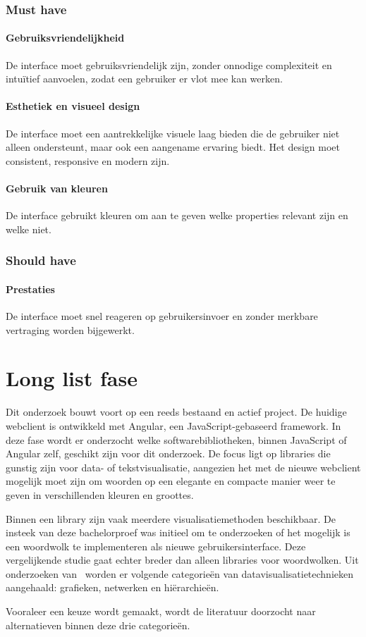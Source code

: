 \subsubsection{Must have}
\paragraph{Gebruiksvriendelijkheid}
De interface moet gebruiksvriendelijk zijn, zonder onnodige complexiteit en intuïtief aanvoelen, zodat een gebruiker er vlot mee kan werken.

\paragraph{Esthetiek en visueel design}
De interface moet een aantrekkelijke visuele laag bieden die de gebruiker niet alleen ondersteunt, maar ook een aangename ervaring biedt. Het design moet consistent, responsive en modern zijn.

\paragraph{Gebruik van kleuren}
De interface gebruikt kleuren om aan te geven welke properties relevant zijn en welke niet.

\subsubsection{Should have}
\paragraph{Prestaties}
De interface moet snel reageren op gebruikersinvoer en zonder merkbare vertraging worden bijgewerkt.

\section {Long list fase}
Dit onderzoek bouwt voort op een reeds bestaand en actief project. De huidige webclient is ontwikkeld met Angular, een JavaScript-gebaseerd framework. In deze fase wordt er onderzocht welke softwarebibliotheken, binnen JavaScript of Angular zelf, geschikt zijn voor dit onderzoek. De focus ligt op libraries die gunstig zijn voor data- of tekstvisualisatie, aangezien het met de nieuwe webclient mogelijk moet zijn om woorden op een elegante en compacte manier weer te geven in verschillenden kleuren en groottes.\smallskip\par
Binnen een library zijn vaak meerdere visualisatiemethoden beschikbaar. De insteek van deze bachelorproef was initieel om te onderzoeken of het mogelijk is een woordwolk te implementeren als nieuwe gebruikersinterface. Deze vergelijkende studie gaat echter breder dan alleen libraries voor woordwolken. Uit onderzoeken van~\textcite{Wang2015} worden er volgende categorieën van datavisualisatietechnieken aangehaald: grafieken, netwerken en hiërarchieën.\par Vooraleer een keuze wordt gemaakt, wordt de literatuur doorzocht naar alternatieven binnen deze drie categorieën.

